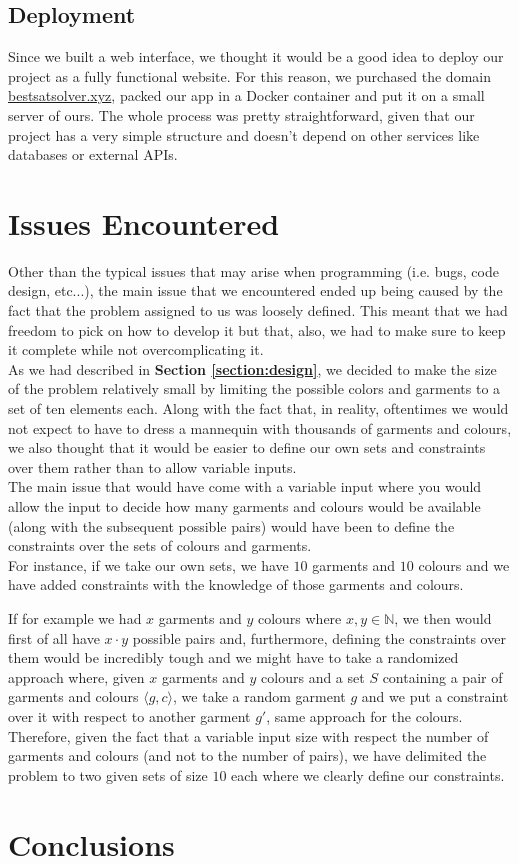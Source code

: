 \documentclass[12pt]{article}
\begin{document}

    \subsection{Deployment}
        Since we built a web interface, we thought it would be a good idea to deploy our project as a fully functional website. 
        For this reason, we purchased the domain \url{bestsatsolver.xyz}, packed our app in a Docker container and put it on a small server of ours.
        The whole process was pretty straightforward, given that our project has a very simple structure and doesn't depend on other services like databases or external APIs.

\section{Issues Encountered}
\label{section:issues}

Other than the typical issues that may arise when programming (i.e. bugs, code design, etc...), the main issue that we encountered ended up being caused by the fact that the problem assigned to us was loosely defined. This meant that we had freedom to pick on how to develop it but that, also, we had to make sure to keep it complete while not overcomplicating it.\\

As we had described in \textbf{Section \ref{section:design}}, we decided to make the size of the problem relatively small by limiting the possible colors and garments to a set of ten elements each. Along with the fact that, in reality, oftentimes we would not expect to have to dress a mannequin with thousands of garments and colours, we also thought that it would be easier to define our own sets and constraints over them rather than to allow variable inputs.\\

The main issue that would have come with a variable input where you would allow the input to decide how many garments and colours would be available (along with the subsequent possible pairs) would have been to define the constraints over the sets of colours and garments.\\

For instance, if we take our own sets, we have $10$ garments and $10$ colours and we have added constraints with the knowledge of those garments and colours.

If for example we had $x$ garments and $y$ colours where $x, y \in \mathbb{N}$, we then would first of all have $x \cdot y$ possible pairs and, furthermore, defining the constraints over them would be incredibly tough and we might have to take a randomized approach where, given $x$ garments and $y$ colours and a set $S$ containing a pair of garments and colours $\langle g, c \rangle$, we take a random garment $g$ and we put a constraint over it with respect to another garment $g'$, same approach for the colours.\\

Therefore, given the fact that a variable input size with respect the number of garments and colours (and not to the number of pairs), we have delimited the problem to two given sets of size $10$ each where we clearly define our constraints.

\section{Conclusions}
\end{document}
